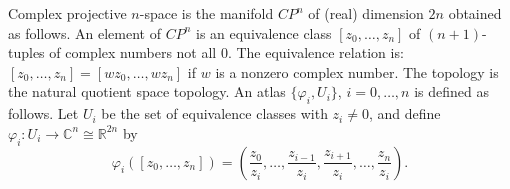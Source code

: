 Complex projective $n$-space is the manifold $CP^n$ of (real) dimension $2n$ obtained as follows. An element of $CP^n$ is an equivalence class $[z_0, \ldots, z_n]$ of $(n+1)$-tuples of complex numbers not all $0$. The equivalence relation is: $[z_0, \ldots, z_n] = [w z_0, \ldots, w z_n]$ if $w$ is a nonzero complex number. The topology is the natural quotient space topology. An atlas $\{\varphi_i, U_i\}$, $i = 0, \ldots, n$ is defined as follows. Let $U_i$ be the set of equivalence classes with $z_i \neq 0$, and define $\varphi_i: U_i \to \mathbb{C}^n \cong \mathbb{R}^{2n}$ by
$$\varphi_i([z_0, \ldots, z_n]) = \left(\frac{z_0}{z_i}, \ldots, \frac{z_{i-1}}{z_i}, \frac{z_{i+1}}{z_i}, \ldots, \frac{z_n}{z_i}\right).$$
